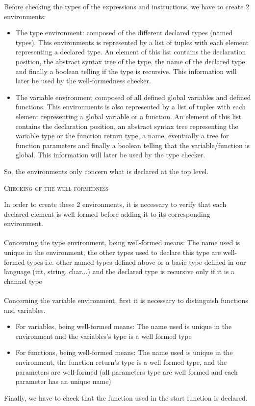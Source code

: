 \documentclass[11pt]{report}
\begin{document}
\tabto{0cm} Before checking the types of the expressions and instructions, we have to create 2 environments:
\begin{itemize}
\item The type environment: composed of the different declared types (named types). This environments is represented by a list of tuples with each element representing a declared type. An element of this list contains the declaration position, the abstract syntax tree of the type, the name of the declared type and finally a boolean telling if the type is recursive. This information will later be used by the well-formedness checker.
\item The variable environment composed of all defined global variables and defined functions. This environments is also represented by a list of tuples with each element representing a global variable or a function. An element of this list contains the declaration position, an abstract syntax tree representing the variable type or the function return type, a name, eventually a tree for function parameters and finally a boolean telling that the variable/function is global. This information will later be used by the type checker.
\end{itemize}
So, the environments only concern what is declared at the top level.\\

\tabto{1cm} {\Large \textsc{Checking of the well-formedness}}

\tabto{0cm}In order to create these 2 environments, it is necessary to verify that each declared element is well formed before adding it to its corresponding environment.\\ \\
Concerning the type environment, being well-formed means: 
The name used is unique in the environment, the other types used to declare this type are well-formed types i.e. other named types defined above or a basic type defined in our language (int, string, char...) and the declared type is recursive only if it is a channel type\\ \\
Concerning the variable environment, first it is  necessary to distinguish functions and variables.
\begin{itemize}
    \item  For variables, being well-formed means: The name used is unique in the environment and the variables's type is a well formed type
    \item For functions, being well-formed means: The name used is unique in the environment, the function return's type is a well formed type, and the parameters are well-formed (all parameters type are well formed and each parameter has an unique name)
\end{itemize}
Finally, we have to check that the function used in the start function is declared.
\end{document}
